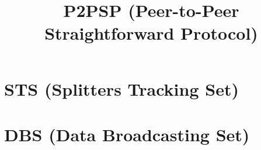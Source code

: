 

\newenvironment{notex}
               {\textbf{Note}:
               }
               {
               }

\title{P2PSP (Peer-to-Peer Straightforward Protocol)}
\maketitle
\tableofcontents

\begin{abstract}

\end{abstract}

\section{STS (Splitters Tracking Set)}


\section{DBS (Data Broadcasting Set)}


